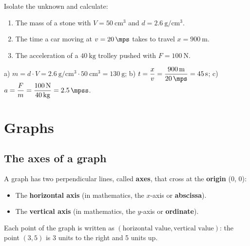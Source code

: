 \begin{exercise}
    Isolate the unknown and calculate:
    \begin{enumerate}[label=\letraminuscula]
        \item The mass of a stone with \(V = \qty{50}{\cubic\cm}\) and \(d = \qty{2.6}{\g\per\cubic\cm}\).
        \item The time a car moving at \(v = \qty{20}{\mps}\) takes to travel \(x = \qty{900}{\m}\).
        \item The acceleration of a \(\qty{40}{\kg}\) trolley pushed with \(F = \qty{100}{\newton}\).
    \end{enumerate}
    \begin{solu}
        a) \(m = d \cdot V = \qty{2.6}{\g\per\cubic\cm} \cdot \qty{50}{\cubic\cm} = \qty{130}{\g}\); \quad
        b) \(t = \dfrac{x}{v} = \dfrac{\qty{900}{\m}}{\qty{20}{\mps}} = \qty{45}{\s}\); \quad
        c) \(a = \dfrac{F}{m} = \dfrac{\qty{100}{\newton}}{\qty{40}{\kg}} = \qty{2.5}{\mpss}\).
    \end{solu}
\end{exercise}


\section{Graphs}

\subsection{The axes of a graph}

A graph has two perpendicular lines, called \textbf{axes}, that cross at the \textbf{origin} (0, 0):
\begin{itemize}
    \item The \textbf{horizontal axis} (in mathematics, the \(x\)-axis or \textbf{abscissa}).
    \item The \textbf{vertical axis} (in mathematics, the \(y\)-axis or \textbf{ordinate}).
\end{itemize}
Each point of the graph is written as \((\text{horizontal value}, \text{vertical value})\): the point \((3, 5)\) is 3 units to the right and 5 units up.

